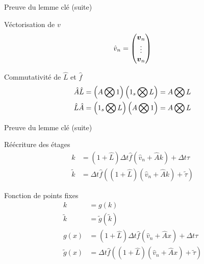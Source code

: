\begin{frame}[<+->]{Preuve du lemme clé (suite)}
 \begin{block}{Véctorisation de $v$}
  \begin{equation*}
\hat{v}_{n}=\begin{pmatrix}
	      {\boldsymbol {v}}_{n}\\
	      \vdots\\
	      {\boldsymbol {v}}_{n}
	      \end{pmatrix}
\end{equation*}
 \end{block}
 
 \begin{block}{Commutativité de $\hat{L}$ et $\hat{f}$}
  \begin{align*}
\hat{A}\hat{L}&=\left(A\bigotimes 1 \right)
  \left(1_{s}\bigotimes L\right)=
	A\bigotimes L\\
    \hat{L}\hat{A}&=
  \left(1_{s}\bigotimes L\right)
	\left(A \bigotimes 1 \right)=
	A\bigotimes L
\end{align*}
 \end{block}

\end{frame}

\begin{frame}[<+->]{Preuve du lemme clé (suite)}
 \begin{block}{Réécriture des étages}
  \begin{align*}
k&=(1+\hat{L})\Delta t\hat{f}(\hat{v}_{n}+\hat{A}k)+\Delta t\tau\\
\tilde{k}&=\Delta t \hat{f}((1+\hat{L})(\hat{v}_{n}+\hat{A}k)+\tilde{\tau})
\end{align*}
 \end{block}
 
 \begin{block}{Fonction de points fixes}
  \begin{align*}
k&=g(k)\\
\tilde{k}&=\tilde{g}(\tilde{k})\\
g(x)&=(1+\hat{L})\Delta t \hat{f}(\hat{v}_{n}+\hat{A}x)+\Delta t\tau\\
\tilde{g}(x)&=\Delta t \hat{f}((1+\hat{L})(\hat{v}_{n}+\hat{A}x)+\tilde{\tau})
\end{align*}
 \end{block}

\end{frame}


